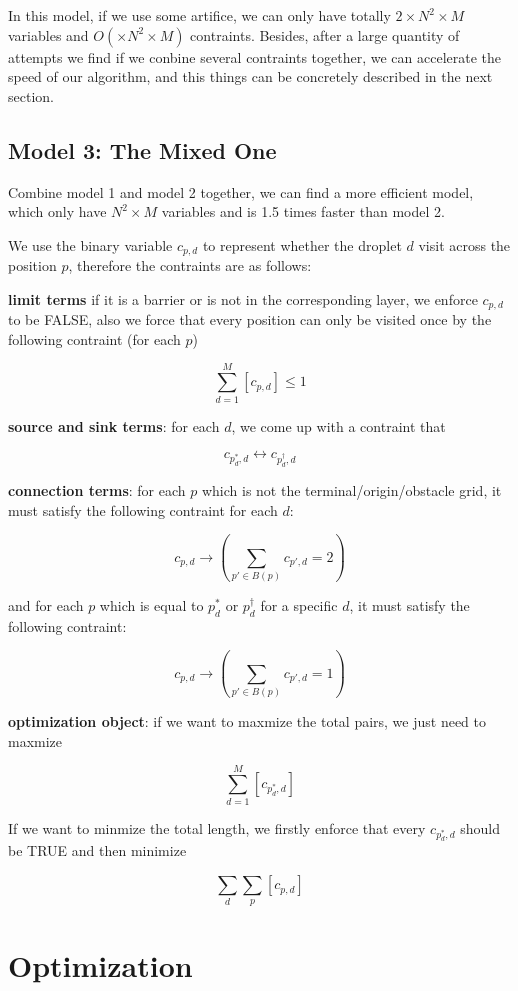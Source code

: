 \documentclass[twocolumn]{article}
\begin{document}
In this model, if we use some artifice, we can only have totally $2 \times N^2 \times M$ variables and $O(\times N^2 \times M)$ contraints. Besides, after a large quantity of attempts we find if we conbine several contraints together, we can accelerate the speed of our algorithm, and this things can be concretely described in the next section.

\subsection{Model 3: The Mixed One}

Combine model 1 and model 2 together, we can find a more efficient model, which only have $N^2 \times M$ variables and is 1.5 times faster than model 2.

We use the binary variable $c_{p,d}$ to represent whether the droplet $d$ visit across the position $p$, therefore the contraints are as follows:

\textbf{limit terms} if it is a barrier or is not in the corresponding layer, we enforce $c_{p,d}$ to be FALSE, also we force that every position can only be visited once by the following contraint (for each $p$)

\[
\sum_{d=1}^{M} [c_{p,d}] \le 1
\]

\textbf{source and sink terms}: for each $d$, we come up with a contraint that

\[
c_{p^*_d,d} \leftrightarrow c_{p^\dagger_d,d}
\]

\textbf{connection terms}: for each $p$ which is not the terminal/origin/obstacle grid, it must satisfy the following contraint for each $d$:

\[
c_{p,d} \to (\sum_{p' \in B(p)}c_{p',d} = 2)
\]

and for each $p$ which is equal to $p^*_d$ or $p^\dagger_d$ for a specific $d$, it must satisfy the following contraint:

\[
c_{p,d} \to (\sum_{p' \in B(p)}c_{p',d} = 1)
\]

\textbf{optimization object}: if we want to maxmize the total pairs, we just need to maxmize

\[
\sum_{d=1}^{M}{[c_{p^*_d,d}]}
\]

If we want to minmize the total length, we firstly enforce that every $c_{p^*_d,d}$ should be TRUE and then minimize

\[
\sum_{d}\sum_{p}{[c_{p,d}]}
\]

\section{Optimization}
\end{document}
